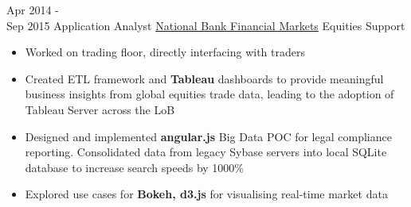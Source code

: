 \documentclass[letterpaper]{twentysecondcv} %
\begin{document}
\begin{twenty}
     \twentyitem
   		{Apr 2014 - \\ Sep 2015}
        {Application Analyst}
        {\href{http://nbfm.ca/}{National Bank Financial Markets}}
        {Equities Support}
        {
        \begin{itemize}
		\item Worked on trading floor, directly interfacing with traders
        \item Created ETL framework and \textbf{Tableau} dashboards to provide meaningful business insights from global equities trade data, leading to the adoption of Tableau Server across the LoB
        \item Designed and implemented \textbf{angular.js} Big Data POC for legal compliance reporting. Consolidated data from legacy Sybase servers into local SQLite database to increase search speeds by 1000\% 
        \item Explored use cases for \textbf{Bokeh, d3.js} for visualising real-time market data
	    \end{itemize}
    	}
        
\end{twenty}
\end{document}
